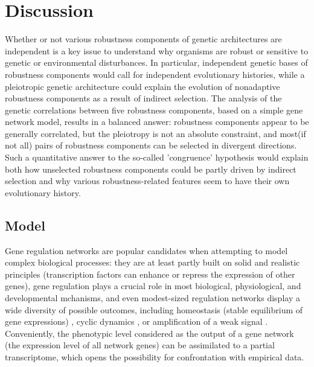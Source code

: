 \documentclass[10pt,a4paper]{article}
\begin{document}
\section{Discussion}

Whether or not various robustness components of genetic architectures are independent is a key issue to understand why organisms are robust or sensitive to genetic or environmental disturbances. In particular, independent genetic bases of robustness components would call for independent evolutionary histories, while a pleiotropic genetic architecture could explain the evolution of nonadaptive robustness components as a result of indirect selection. The analysis of the genetic correlations between five robustness components, based on a simple gene network model, results in a balanced answer: robustness components appear to be generally correlated, but the pleiotropy is not an absolute constraint, and most(if not all) pairs of robustness components can be selected in divergent directions. Such a quantitative answer to the so-called 'congruence' hypothesis \citep{dHW+03} would explain both how unselected robustness components could be partly driven by indirect selection and why various robustness-related features seem to have their own evolutionary history. 

\subsection{Model}

Gene regulation networks are popular candidates when attempting to model complex biological processes: they are at least partly built on solid and realistic principles (transcription factors can enhance or repress the expression of other genes), gene regulation plays a crucial role in most biological, physiological, and developmental mchanisms, and even modest-sized regulation networks display a wide diversity of possible outcomes, including homeostasis (stable equilibrium of gene expressions) \citep{Ste99}, cyclic dynamics \citep{LG03,ARB+10}, or amplification of a weak signal \citep{HB08}. Conveniently, the phenotypic level considered as the output of a gene network (the expression level of all network genes) can be assimilated to a partial transcriptome, which opens the possibility for confrontation with empirical data. 
\end{document}
